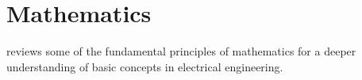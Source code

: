 \cleardoublepage
\chapter{Mathematics}
\label{ch:math}

 reviews some of the fundamental principles of mathematics for a deeper understanding of basic concepts in electrical engineering.


